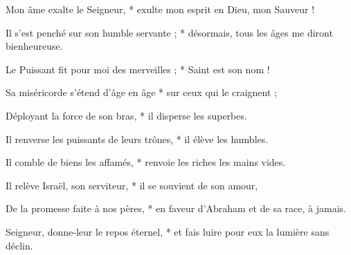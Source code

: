 \item Mon âme exalte le Seigneur, * exulte mon esprit en Dieu, mon Sauveur !

\item Il s'est penché sur son humble servante ; * désormais, tous les âges me diront bienheureuse.

\item Le Puissant fit pour moi des merveilles ; * Saint est son nom !

\item Sa miséricorde s'étend d'âge en âge * sur ceux qui le craignent ;

\item Déployant la force de son bras, * il disperse les superbes.

\item Il renverse les puissants de leurs trônes, * il élève les humbles.

\item Il comble de biens les affamés, * renvoie les riches les mains vides.

\item Il relève Israël, son serviteur, * il se souvient de son amour,

\item De la promesse faite à nos pères, * en faveur d'Abraham et de sa race, à jamais.

\item Seigneur, donne-leur le repos éternel, * et fais luire pour eux la lumière sans déclin.